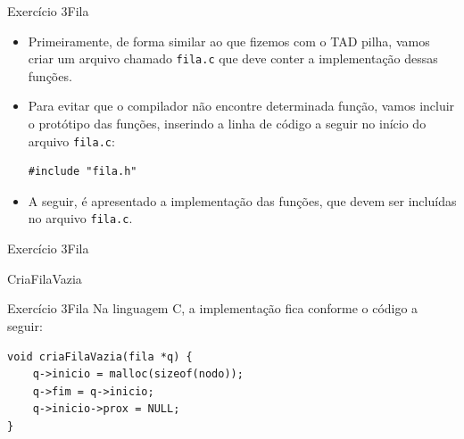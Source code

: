 \documentclass[aspectratio=169]{beamer}
\begin{document}

\begin{frame}[fragile]{Exercício 3}{Fila}
\begin{itemize}
\item Primeiramente, de forma similar ao que fizemos com o TAD pilha, vamos criar um arquivo chamado \verb|fila.c| que deve conter a implementação dessas funções.
\item Para evitar que o compilador não encontre determinada função, vamos incluir o protótipo das funções, inserindo a linha de código a seguir no início do arquivo \verb|fila.c|:
\begin{lstlisting}[style=CStyle]
#include "fila.h"
\end{lstlisting}  
\item A seguir, é apresentado a implementação das funções, que devem ser incluídas no arquivo \verb|fila.c|.
\end{itemize}
\end{frame}


\begin{frame}[fragile]{Exercício 3}{Fila}
\begin{algorithm}[H]
\caption{CriaFilaVazia} 
\label{CriaFilaVazia}
\end{algorithm}
\end{frame}


\begin{frame}[fragile]{Exercício 3}{Fila}
Na linguagem C, a implementação fica conforme o código a seguir:
\begin{lstlisting}[style=CStyle]
void criaFilaVazia(fila *q) {
    q->inicio = malloc(sizeof(nodo));
    q->fim = q->inicio;
    q->inicio->prox = NULL;
}
\end{lstlisting}  

\end{frame}

\end{document}
